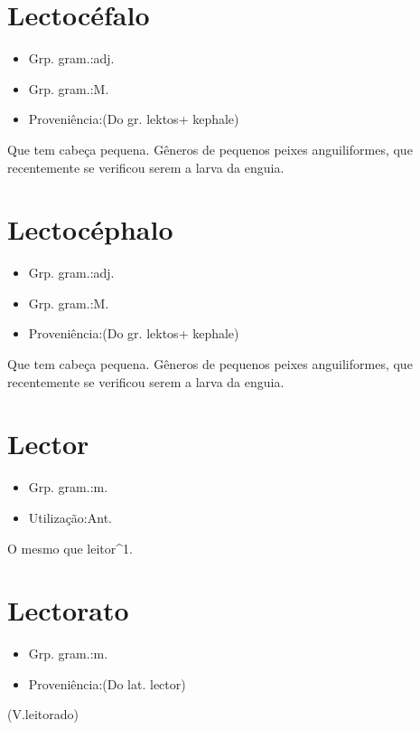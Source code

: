 \section{Lectocéfalo}
\begin{itemize}
\item {Grp. gram.:adj.}
\end{itemize}
\begin{itemize}
\item {Grp. gram.:M.}
\end{itemize}
\begin{itemize}
\item {Proveniência:(Do gr. \textunderscore lektos\textunderscore  + \textunderscore kephale\textunderscore )}
\end{itemize}
Que tem cabeça pequena.
Gêneros de pequenos peixes anguiliformes, que recentemente se verificou serem a larva da enguia.
\section{Lectocéphalo}
\begin{itemize}
\item {Grp. gram.:adj.}
\end{itemize}
\begin{itemize}
\item {Grp. gram.:M.}
\end{itemize}
\begin{itemize}
\item {Proveniência:(Do gr. \textunderscore lektos\textunderscore  + \textunderscore kephale\textunderscore )}
\end{itemize}
Que tem cabeça pequena.
Gêneros de pequenos peixes anguiliformes, que recentemente se verificou serem a larva da enguia.
\section{Lector}
\begin{itemize}
\item {Grp. gram.:m.}
\end{itemize}
\begin{itemize}
\item {Utilização:Ant.}
\end{itemize}
O mesmo que \textunderscore leitor\textunderscore ^1.
\section{Lectorato}
\begin{itemize}
\item {Grp. gram.:m.}
\end{itemize}
\begin{itemize}
\item {Proveniência:(Do lat. \textunderscore lector\textunderscore )}
\end{itemize}
(V.leitorado)
